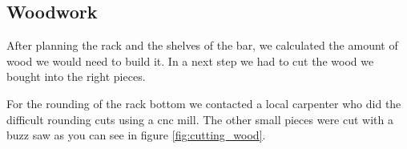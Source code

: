 \documentclass{acm_proc_article-sp}
\begin{document}
\subsection{Woodwork}
After planning the rack and the shelves of the bar, we calculated the amount of wood we would need to build it. In a next step we had to cut the wood we bought into the right pieces.

\begin{minipage}{\linewidth}%
\label{fig:cutting_wood}%
\end{minipage}


For the rounding of the rack bottom we contacted a local carpenter who did the difficult rounding cuts using a cnc mill. The other small pieces were cut with a buzz saw as you can see in figure \ref{fig:cutting_wood}.

\begin{minipage}{\linewidth}%
\label{fig:assembling}%
\end{minipage}
\end{document}
